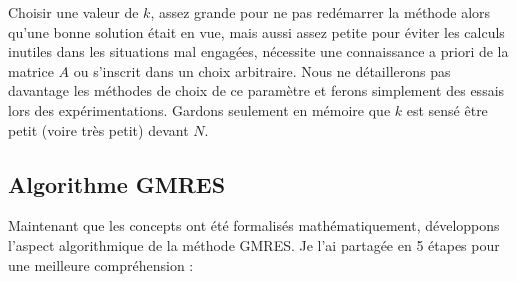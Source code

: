 \documentclass[11pt,a4paper,oneside]{memoir}
\theoremstyle{definition}
\theoremstyle{remark}
\theoremstyle{plain}
\begin{document}
Choisir une valeur de $k$, assez grande pour ne pas redémarrer la méthode alors qu'une bonne solution était en vue, mais aussi assez petite pour éviter les calculs inutiles dans les situations mal engagées, nécessite une connaissance a priori de la matrice $A$ ou s'inscrit dans un choix arbitraire. Nous ne détaillerons pas davantage les méthodes de choix de ce paramètre et ferons simplement des essais lors des expérimentations. Gardons seulement en mémoire que $k$ est sensé être petit (voire très petit) devant $N$.


\subsection{Algorithme GMRES}

Maintenant que les concepts ont été formalisés mathématiquement, développons l'aspect algorithmique de la méthode GMRES. Je l'ai partagée en 5 étapes pour une meilleure compréhension :
\end{document}
